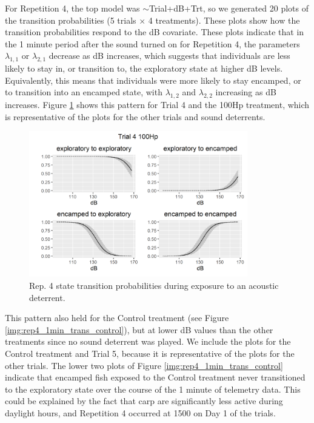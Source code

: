 \documentclass[12pt]{article}
\begin{document}
			For Repetition 4, the top model was $\sim$Trial+dB+Trt, so we generated 20 plots of the transition probabilities (5 trials $\times$ 4 treatments). These plots show how the transition probabilities respond to the dB covariate. These plots indicate that in the 1 minute period after the sound turned on for Repetition 4, the parameters $\lambda_{1, 1}$ or $\lambda_{2, 1}$ decrease as dB increases, which suggests that individuals are less likely to stay in, or transition to, the exploratory state at higher dB levels. Equivalently, this means that individuals were more likely to stay encamped, or to transition into an encamped state, with $\lambda_{1, 2}$ and $\lambda_{2, 2}$ increasing as dB increases. Figure \ref{img:rep4_1min_trans_tmnt} shows this pattern for Trial 4 and the 100Hp treatment, which is representative of the plots for the other trials and sound deterrents.
			
			\begin{figure}
				\centering
				\includegraphics[width=0.85\textwidth]{trans_rep_4_trial_4_100Hp.png}
				\caption{Rep. 4 state transition probabilities during exposure to an acoustic deterrent.}
				\label{img:rep4_1min_trans_tmnt}
			\end{figure}
			
			This pattern also held for the Control treatment (see Figure \ref{img:rep4_1min_trans_control}), but at lower dB values than the other treatments since no sound deterrent was played. We include the plots for the Control treatment and Trial 5, because it is representative of the plots for the other trials. The lower two plots of Figure \ref{img:rep4_1min_trans_control} indicate that encamped fish exposed to the Control treatment never transitioned to the exploratory state over the course of the 1 minute of telemetry data. This could be explained by the fact that carp are significantly less active during daylight hours, and Repetition 4 occurred at 1500 on Day 1 of the trials.
			
\end{document}
